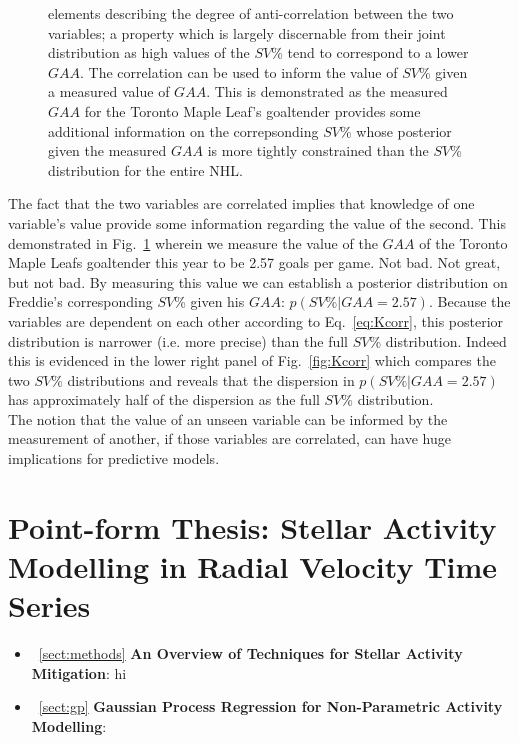\begin{figure}
{    elements describing the degree of anti-correlation between the two
    variables; a property which is largely discernable from their joint
    distribution as high values of the $SV$\% tend to correspond to a lower
    $GAA$. The correlation can be used to inform the value of $SV$\% given a
    measured value of $GAA$. This is demonstrated as the measured $GAA$ 
    for the Toronto Maple Leaf's goaltender 
    provides some
    additional information on the correpsonding $SV$\% whose posterior given the
    measured $GAA$ is more tightly constrained than the $SV$\% distribution for
    the entire NHL.}
  \label{fig:corr2d}
\end{figure}

The fact that the two variables are
correlated implies that knowledge of one variable's value provide some information
regarding the value of the second. This demonstrated in Fig.~\ref{fig:corr2d}
wherein we measure the value of the $GAA$ of the Toronto Maple Leafs goaltender
this year to be 2.57 goals per game. Not bad. Not great, but not bad. By measuring
this value we can establish a posterior distribution on Freddie's corresponding
$SV$\% given his $GAA$: $p(SV\%|GAA=2.57)$. Because the variables are dependent
on each other according to Eq.~\ref{eq:Kcorr}, this posterior distribution is
narrower (i.e. more precise) than the full $SV$\% distribution. Indeed this is
evidenced in the lower right panel of Fig.~\ref{fig:Kcorr} which compares the
two $SV$\% distributions and reveals that the dispersion in $p(SV\%|GAA=2.57)$
has approximately half of the dispersion as the full $SV$\% distribution. \\

The notion that the value of an unseen variable can be informed by the measurement
of another, if those variables are correlated, can have huge implications for
predictive models.


\section{Point-form Thesis: Stellar Activity Modelling in Radial Velocity
  Time Series}
\begin{itemize}
\renewcommand\labelitemi{--}
\item~\ref{sect:methods} \textbf{An Overview of Techniques for Stellar Activity
Mitigation}: hi \\
\item~\ref{sect:gp} \textbf{Gaussian Process Regression for Non-Parametric
  Activity Modelling}:
\end{itemize}
